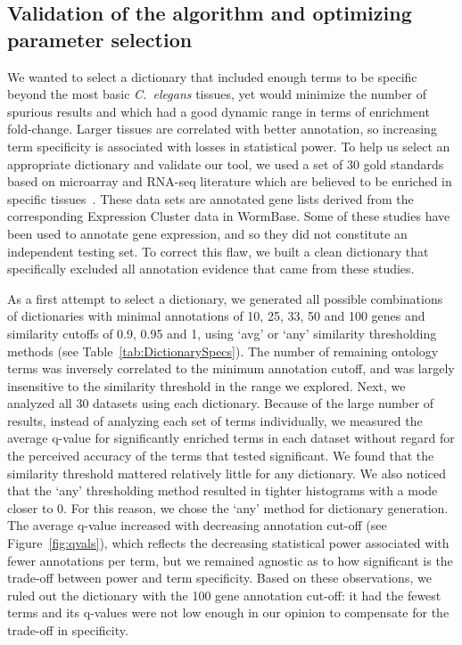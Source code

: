 \documentclass{bmcart}
\begin{document}
\subsection*{Validation of the algorithm and optimizing parameter selection}
We wanted to select a dictionary that included enough terms to be specific beyond the most basic %
 \emph{C.~elegans} tissues, yet would minimize the number of spurious results and which had a good dynamic range in terms of enrichment fold-change. Larger tissues are correlated with better annotation, so increasing term specificity is associated with losses in statistical power.
To help us select an appropriate dictionary and validate our tool, we used a set of 30 gold standards based on microarray and RNA-seq literature which are believed to be enriched in specific tissues~\cite{Gaudet2004a, Spencer2011, Cinar2005, Watson2008a, Pauli2006, Portman2004, Fox2007, Smith2010}. These data sets are annotated gene lists derived from the corresponding Expression Cluster data in WormBase. Some of these studies have been used to annotate gene expression, and so they did not constitute an independent testing set. To correct this flaw, we built a clean dictionary that specifically excluded all annotation evidence that came from these studies.

As a first attempt to select a dictionary, we generated all possible combinations of dictionaries with minimal annotations of 10, 25, 33, 50 and 100 genes and similarity cutoffs of 0.9, 0.95 and 1, using `avg' or `any' similarity thresholding methods (see Table~\ref{tab:DictionarySpecs}). The number of remaining ontology terms was inversely correlated to the minimum annotation cutoff, and was largely insensitive to the similarity threshold in the range we explored. Next, we analyzed all 30 datasets using each dictionary. Because of the large number of results, instead of analyzing each set of terms individually, we measured the average q-value for significantly enriched terms in each dataset without regard for the perceived accuracy of the terms that tested significant. We found that the similarity threshold mattered relatively little for any dictionary. We also noticed that the `any' thresholding method resulted in tighter histograms with a mode closer to 0. For this reason, we chose the `any' method for dictionary generation. The average q-value increased with decreasing annotation cut-off (see Figure~\ref{fig:qvals}), which reflects the decreasing statistical power associated with fewer annotations per term, but we remained agnostic as to how significant is the trade-off between power and term specificity. Based on these observations, we ruled out the dictionary with the 100 gene annotation cut-off: it had the fewest terms and its q-values were not low enough in our opinion to compensate for the trade-off in specificity. 
\end{document}
